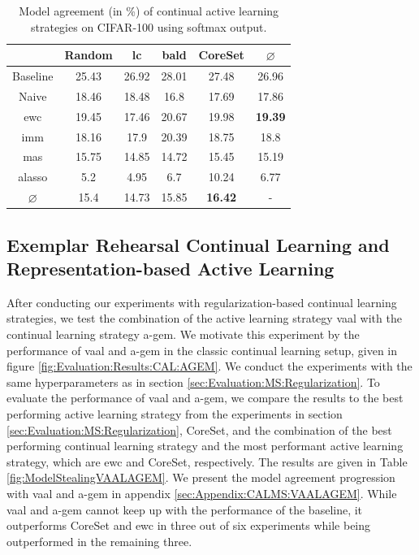 \begin{table}[h]
    \centering
    \begin{tabular}{ c | c c c c | c } 
         & Random & \gls{lc} & \gls{bald} & CoreSet & $\varnothing$\\ 
        \hline
        Baseline & 25.43 & 26.92 & 28.01 & 27.48 & 26.96 \\
        \hline
        Naive & 18.46 & 18.48 & 16.8 & 17.69 & 17.86\\
        \gls{ewc} & 19.45 & 17.46 & 20.67 & 19.98 & \textbf{19.39}\\
        \gls{imm} & 18.16 & 17.9 & 20.39 & 18.75 & 18.8\\
        \gls{mas} & 15.75 & 14.85 & 14.72 & 15.45 & 15.19\\
        \gls{alasso} & 5.2 & 4.95 & 6.7 & 10.24 & 6.77\\
        \hline
        $\varnothing$ & 15.4 & 14.73 & 15.85 & \textbf{16.42} & -\\
    \end{tabular}
    \caption{Model agreement (in \%) of continual active learning strategies on CIFAR-100 using softmax output.}
    \label{fig:ModelStealingCIFAR100Softmax}
\end{table}



\subsection{Exemplar Rehearsal Continual Learning and Representation-based Active Learning}
\label{sec:Evaluation:CALMS:VAAL_AGEM}

After conducting our experiments with regularization-based continual learning strategies, we test the combination of the active learning strategy \gls{vaal}
with the continual learning strategy \gls{a-gem}. We motivate this experiment by the performance of \gls{vaal} and \gls{a-gem} in the classic continual
learning setup, given in figure \ref{fig:Evaluation:Results:CAL:AGEM}. We conduct the experiments with the same hyperparameters as in section 
\ref{sec:Evaluation:MS:Regularization}. To evaluate the performance of \gls{vaal} and \gls{a-gem}, we compare the results to the best performing active
learning strategy from the experiments in section \ref{sec:Evaluation:MS:Regularization}, CoreSet, and the combination of the best
performing continual learning strategy and the most performant active learning strategy, which are \gls{ewc} and CoreSet, respectively. The results are given
in Table \ref{fig:ModelStealingVAALAGEM}. We present the model agreement progression with \gls{vaal} and \gls{a-gem} in appendix
\ref{sec:Appendix:CALMS:VAALAGEM}. While \gls{vaal} and \gls{a-gem} cannot keep up with the performance of the baseline, it outperforms CoreSet and \gls{ewc}
in three out of six experiments while being outperformed in the remaining three. \par

